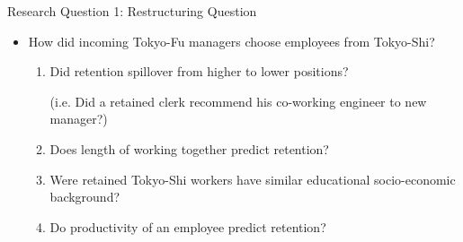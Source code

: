 \begin{frame}{Research Question 1: Restructuring}
Question
    \begin{itemize}
        \item How did incoming Tokyo-Fu managers choose employees from Tokyo-Shi?
        \begin{enumerate}
            \item Did retention spillover from higher to lower positions?

            (i.e. Did a retained clerk recommend his co-working engineer to new manager?)

            \item Does length of working together predict retention?

            \item Were retained Tokyo-Shi workers have similar educational socio-economic background?

            \item Do productivity of an employee predict retention?
        \end{enumerate}
    \end{itemize}
\end{frame}